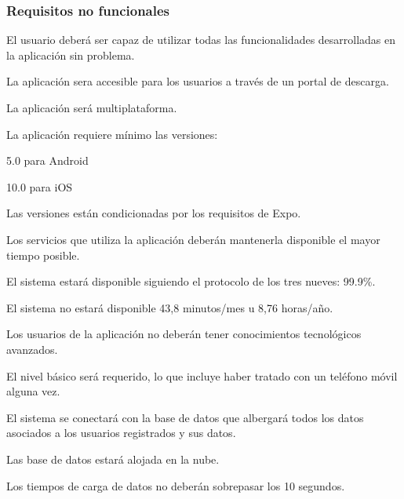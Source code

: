 \subsubsection*{Requisitos no funcionales}
\begin{myEnumNF}
	\item El usuario deberá ser capaz de utilizar todas las funcionalidades desarrolladas en la aplicación sin problema.
	\item La aplicación sera accesible para los usuarios a través de un portal de descarga.
	\begin{myEnumNF}
		\item La aplicación será multiplataforma.
		\begin{myEnumNF}
			\item La aplicación requiere mínimo las versiones:
			\begin{myEnumNF}
				\item 5.0 para Android
				\item 10.0 para iOS
			\end{myEnumNF}
			\item Las versiones están condicionadas por los requisitos de Expo.
		\end{myEnumNF}
	\end{myEnumNF}
	
	\item Los servicios que utiliza la aplicación deberán mantenerla disponible el mayor tiempo posible.
	\begin{myEnumNF}
		\item El sistema estará disponible siguiendo el protocolo de los tres nueves: 99.9\%.
		\begin{myEnumNF}
			\item El sistema no estará disponible 43,8 minutos/mes u 8,76 horas/año.
		\end{myEnumNF}
	\end{myEnumNF}
	\item Los usuarios de la aplicación no deberán tener conocimientos tecnológicos avanzados.
		\begin{myEnumNF}
		\item El nivel básico será requerido, lo que incluye haber tratado con un teléfono móvil alguna vez.
	\end{myEnumNF}
	
	\item El sistema se conectará con la base de datos que albergará todos los datos asociados a los usuarios registrados y sus datos.
	\begin{myEnumNF}
		\item Las base de datos estará alojada en la nube.
		\item Los tiempos de carga de datos no deberán sobrepasar los 10 segundos.
	\end{myEnumNF}


\end{myEnumNF}
